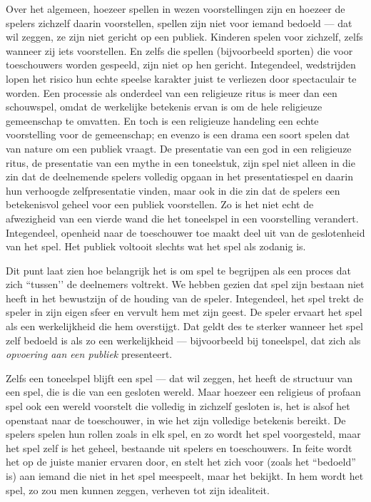 Over het algemeen, hoezeer spellen in wezen voorstellingen zijn en hoezeer de spelers zichzelf daarin voorstellen, spellen zijn niet voor iemand bedoeld — dat wil zeggen, ze zijn niet gericht op een publiek. Kinderen spelen voor zichzelf, zelfs wanneer zij iets voorstellen. En zelfs die spellen (bijvoorbeeld sporten) die voor toeschouwers worden gespeeld, zijn niet op hen gericht. Integendeel, wedstrijden lopen het risico hun echte speelse karakter juist te verliezen door spectaculair te worden. Een processie als onderdeel van een religieuze ritus is meer dan een schouwspel, omdat de werkelijke betekenis ervan is om de hele religieuze gemeenschap te omvatten. En toch is een religieuze handeling een echte voorstelling voor de gemeenschap; en evenzo is een drama een soort spelen dat van nature om een publiek vraagt. De presentatie van een god in een religieuze ritus, de presentatie van een mythe in een toneelstuk, zijn spel niet alleen in die zin dat de deelnemende spelers volledig opgaan in het presentatiespel en daarin hun verhoogde zelfpresentatie vinden, maar ook in die zin dat de spelers een betekenisvol geheel voor een publiek voorstellen. Zo is het niet echt de afwezigheid van een vierde wand die het toneelspel in een voorstelling verandert. Integendeel, openheid naar de toeschouwer toe maakt deel uit van de geslotenheid van het spel. Het publiek voltooit slechts wat het spel als zodanig is.

Dit punt laat zien hoe belangrijk het is om spel te begrijpen als een proces dat zich ``tussen'’ de deelnemers voltrekt. We hebben gezien dat spel zijn bestaan niet heeft in het bewustzijn of de houding van de speler. Integendeel, het spel trekt de speler in zijn eigen sfeer en vervult hem met zijn geest. De speler ervaart het spel als een werkelijkheid die hem overstijgt. Dat geldt des te sterker wanneer het spel zelf bedoeld is als zo een werkelijkheid — bijvoorbeeld bij toneelspel, dat zich als \textit{opvoering aan een publiek} presenteert.

Zelfs een toneelspel blijft een spel — dat wil zeggen, het heeft de structuur van een spel, die is die van een gesloten wereld. Maar hoezeer een religieus of profaan spel ook een wereld voorstelt die volledig in zichzelf gesloten is, het is alsof het openstaat naar de toeschouwer, in wie het zijn volledige betekenis bereikt. De spelers spelen hun rollen zoals in elk spel, en zo wordt het spel voorgesteld, maar het spel zelf is het geheel, bestaande uit spelers en toeschouwers. In feite wordt het op de juiste manier ervaren door, en stelt het zich voor (zoals het ``bedoeld'' is) aan iemand die niet in het spel meespeelt, maar het bekijkt. In hem wordt het spel, zo zou men kunnen zeggen, verheven tot zijn idealiteit.

